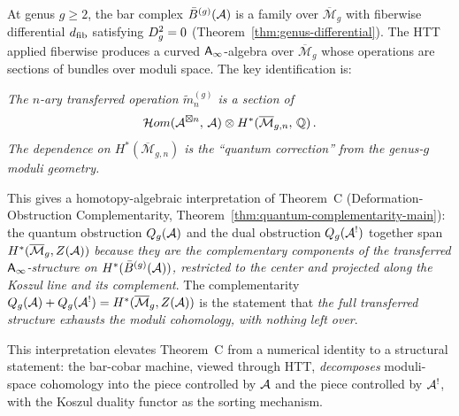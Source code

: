 \begin{remark}
\label{rem:higher-genus-htt}
At genus $g \geq 2$, the bar complex $\bar{B}^{(g)}(\mathcal{A})$ is a family
over $\overline{\mathcal{M}}_g$ with fiberwise differential $d_{\mathrm{fib}}$
satisfying $D_{g}^2 = 0$ (Theorem~\ref{thm:genus-differential}).
The HTT applied fiberwise produces a curved $\mathsf{A}_{\infty}$-algebra over
$\overline{\mathcal{M}}_g$ whose operations are sections of bundles
over moduli space.  The key identification is:

\medskip
\emph{The $n$-ary transferred operation $\tilde{m}_n^{(g)}$ is a
section of
\[
\mathcal{H}om(\mathcal{A}^{\boxtimes n},\, \mathcal{A}) \otimes
H^*(\overline{\mathcal{M}}_{g,n},\, \mathbb{Q})\,.
\]
The dependence on $H^*(\overline{\mathcal{M}}_{g,n})$ is the
``quantum correction'' from the genus-$g$ moduli geometry.}

\medskip
\noindent
This gives a homotopy-algebraic interpretation of Theorem~C
(Deformation-Obstruction Complementarity,
Theorem~\ref{thm:quantum-complementarity-main}):
the quantum obstruction $Q_g(\mathcal{A})$ and the dual obstruction
$Q_g(\mathcal{A}^!)$ together span $H^*(\overline{\mathcal{M}}_g, Z(\mathcal{A}))$
\emph{because they are the complementary components of the
transferred $\mathsf{A}_{\infty}$-structure on $H^*(\bar{B}^{(g)}(\mathcal{A}))$, restricted
to the center and projected along the Koszul line and its complement}.
The complementarity $Q_g(\mathcal{A}) + Q_g(\mathcal{A}^!) =
H^*(\overline{\mathcal{M}}_g, Z(\mathcal{A}))$ is the statement that
\emph{the full transferred structure exhausts the moduli
cohomology, with nothing left over}.

This interpretation elevates Theorem~C from a numerical identity to a
structural statement: the bar-cobar machine, viewed through HTT,
\emph{decomposes} moduli-space cohomology into the piece
controlled by $\mathcal{A}$ and the piece controlled by $\mathcal{A}^!$, with the
Koszul duality functor as the sorting mechanism.
\end{remark}

